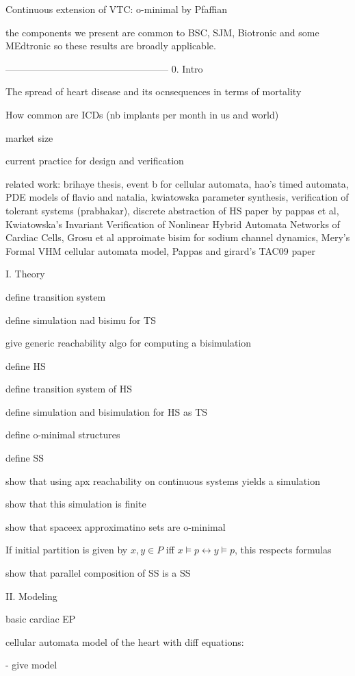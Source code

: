 Continuous extension of VTC: o-minimal by Pfaffian

the components we present are common to BSC, SJM, Biotronic and some MEdtronic so these results are broadly applicable.


---------------------------------------------------
0. Intro

The spread of heart disease and its ocnsequences in terms of mortality

How common are ICDs (nb implants per month in us and world)

market size

current practice for design and verification

related work: brihaye thesis, 
event b for cellular automata, hao's timed automata, PDE models of flavio and natalia, kwiatowska parameter synthesis, verification of tolerant systems (prabhakar), discrete abstraction of HS paper by pappas et al,
Kwiatowska's Invariant Verification of Nonlinear Hybrid Automata Networks of Cardiac Cells,
Grosu et al approimate bisim for sodium channel dynamics,
Mery's Formal VHM cellular automata model,
Pappas and girard's TAC09 paper

I. Theory

define transition system

define simulation nad bisimu for TS

give generic reachability algo for computing a bisimulation

define HS

define transition system of HS

define simulation and bisimulation for HS as TS

define o-minimal structures

define SS

show that using apx reachability on continuous systems yields a simulation

show that this simulation is finite

show that spaceex approximatino sets are o-minimal 

If initial partition is given by $x,y \in P$ iff $x \models p \leftrightarrow y \models p$, this respects formulas

show that parallel composition of SS is a SS


II. Modeling

basic cardiac EP 

cellular automata model of the heart with diff equations: 
	
	- give model
	
